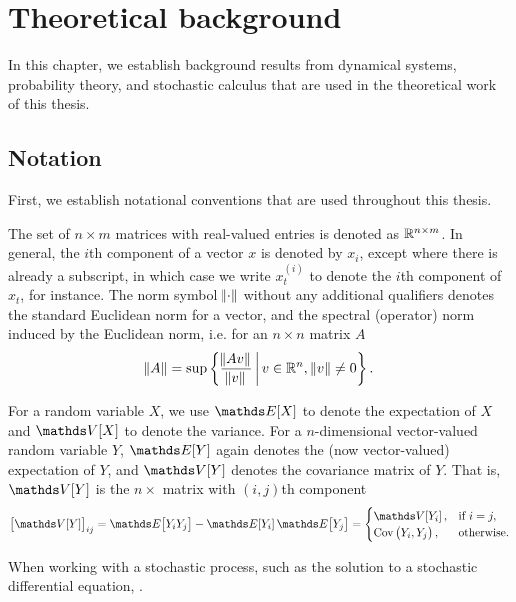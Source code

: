 
\chapter{Theoretical background}
In this chapter, we establish background results from dynamical systems, probability theory, and stochastic calculus that are used in the theoretical work of this thesis.

\section{Notation}
First, we establish notational conventions that are used throughout this thesis.

The set of \(n \times m\) matrices with real-valued entries is denoted as \(\mathbb{R}^{n\times m}\).
In general, the \(i\)th component of a vector \(x\) is denoted by \(x_{i}\), except where there is already a subscript, in which case we write \(x_t^{(i)}\) to denote the \(i\)th component of \(x_t\), for instance.
The norm symbol \(\norm{\cdot}\) without any additional qualifiers denotes the standard Euclidean norm for a vector, and the spectral (operator) norm induced by the Euclidean norm, i.e. for an \(n \times n\) matrix \(A\)
\[
	\norm{A} = \sup\left\{\frac{\norm{Av}}{\norm{v}}\,\middle|\,v \in \mathbb{R}^n, \, \norm{v} \neq 0\right\}.
\]


For a random variable \(X\), we use \(\avg{X}\) to denote the expectation of \(X\) and \(\var{X}\) to denote the variance.
For a \(n\)-dimensional vector-valued random variable \(Y\), \(\avg{Y}\) again denotes the (now vector-valued) expectation of \(Y\), and \(\var{Y}\) denotes the covariance matrix of \(Y\).
That is, \(\var{Y}\) is the \(n\times\) matrix with \((i,j)\)th component
\[
	\left[\var{Y}\right]_{ij} = \avg{Y_iY_j} - \avg{Y_i}\avg{Y_j} = \begin{cases}
		\var{Y_i},                         & \text{if } i = j, \\
		\mathrm{Cov}\left(Y_i, Y_j\right), & \text{otherwise}.
	\end{cases}
\]

When working with a stochastic process, such as the solution to a stochastic differential equation, .



